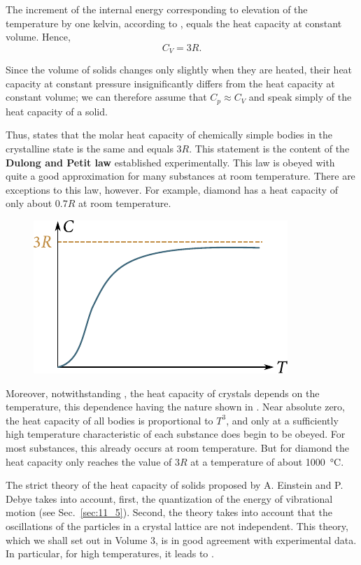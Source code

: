 The increment of the internal energy corresponding to elevation of the temperature by one kelvin, according to , equals the heat capacity at constant volume. Hence,
\begin{equation}\label{eq:13_1}
	C_V = 3R.
\end{equation}

\noindent
Since the volume of solids changes only slightly when they are heated, their heat capacity at constant pressure insignificantly differs from the heat capacity at constant volume; we can therefore assume that $C_p\approx C_V$ and speak simply of the heat capacity of a solid.

Thus,  states that the molar heat capacity of chemically simple bodies in the crystalline state is the same and equals $3R$. This statement is the content of the \textbf{Dulong and Petit law} established experimentally. This law is obeyed with quite a good approximation for many substances at room temperature. There are exceptions to this law, however. For example, diamond has a heat capacity of only about $0.7R$ at room temperature.

\begin{figure}[t]
	\begin{center}
		\includegraphics[scale=1.0]{figures/ch_13/fig_13_11.pdf}
		\caption[]{}
		\label{fig:13_11}
	\end{center}
	\vspace{-0.8cm}
\end{figure}

Moreover, notwithstanding , the heat capacity of crystals depends on the temperature, this dependence having the nature shown in . Near absolute zero, the heat capacity of all bodies is proportional to $T^3$, and only at a sufficiently high temperature characteristic of each substance does  begin to be obeyed. For most substances, this already occurs at room temperature. But for diamond the heat capacity only reaches the value of $3R$ at a temperature of about \SI{1000}{\degreeCelsius}.

The strict theory of the heat capacity of solids proposed by A. Einstein and P. Debye takes into account, first, the quantization of the energy of vibrational motion (see Sec.~\ref{sec:11_5}). Second, the theory takes into account that the oscillations of the particles in a crystal lattice are not independent. This theory, which we shall set out in Volume 3, is in good agreement with experimental data. In particular, for high temperatures, it leads to .
